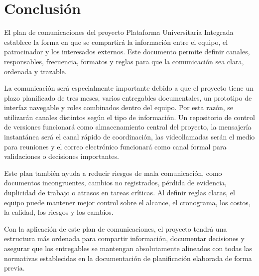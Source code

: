 \documentclass[11pt,spanish]{article}
\begin{document}
\section{Conclusión}

El plan de comunicaciones del proyecto Plataforma Universitaria Integrada establece la forma en que se compartirá la información entre el equipo, el patrocinador y los interesados externos. Este documento permite definir canales, responsables, frecuencia, formatos y reglas para que la comunicación sea clara, ordenada y trazable.

La comunicación será especialmente importante debido a que el proyecto tiene un plazo planificado de tres meses, varios entregables documentales, un prototipo de interfaz navegable y roles combinados dentro del equipo. Por esta razón, se utilizarán canales distintos según el tipo de información. Un repositorio de control de versiones funcionará como almacenamiento central del proyecto, la mensajería instantánea será el canal rápido de coordinación, las videollamadas serán el medio para reuniones y el correo electrónico funcionará como canal formal para validaciones o decisiones importantes.

Este plan también ayuda a reducir riesgos de mala comunicación, como documentos incongruentes, cambios no registrados, pérdida de evidencia, duplicidad de trabajo o atrasos en tareas críticas. Al definir reglas claras, el equipo puede mantener mejor control sobre el alcance, el cronograma, los costos, la calidad, los riesgos y los cambios.

Con la aplicación de este plan de comunicaciones, el proyecto tendrá una estructura más ordenada para compartir información, documentar decisiones y asegurar que los entregables se mantengan absolutamente alineados con todas las normativas establecidas en la documentación de planificación elaborada de forma previa.
\end{document}
